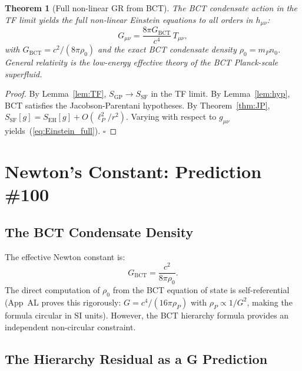 \documentclass[11pt,a4paper]{article}
\theoremstyle{bctthm}
\newtheorem{theorem}{Theorem}
\theoremstyle{definition}
\begin{document}
\begin{theorem}[Full non-linear GR from BCT]\label{thm:main}
The BCT condensate action in the TF limit yields the full non-linear
Einstein equations to all orders in $h_{\mu\nu}$:
\begin{equation}
\boxed{G_{\mu\nu} = \frac{8\pi G_\mathrm{BCT}}{c^4}\,T_{\mu\nu},}
\label{eq:Einstein_full}
\end{equation}
with $G_\mathrm{BCT} = c^2/(8\pi\rho_0)$ and the exact BCT condensate density
$\rho_0 = m_P n_0$. General relativity is the low-energy effective theory of the
BCT Planck-scale superfluid.
\end{theorem}
\begin{proof}
By Lemma~\ref{lem:TF}, $S_\mathrm{GP} \to S_\mathrm{SF}$ in the TF limit.
By Lemma~\ref{lem:hyp}, BCT satisfies the Jacobson-Parentani hypotheses.
By Theorem~\ref{thm:JP}, $S_\mathrm{SF}[g] = S_\mathrm{EH}[g] + O(\ell_P^2/r^2)$.
Varying with respect to $g_{\mu\nu}$ yields~(\ref{eq:Einstein_full}). $\square$
\end{proof}


\section{Newton's Constant: Prediction \#100}

\subsection{The BCT Condensate Density}

The effective Newton constant is:
\begin{equation}
G_\mathrm{BCT} = \frac{c^2}{8\pi\rho_0}.
\label{eq:G_BCT}
\end{equation}
The direct computation of $\rho_0$ from the BCT equation of state is
self-referential (App~AL proves this rigorously: $G = c^4/(16\pi\rho_P)$ with
$\rho_P \propto 1/G^2$, making the formula circular in SI units). However,
the BCT hierarchy formula provides an independent non-circular constraint.

\subsection{The Hierarchy Residual as a G Prediction}
\end{document}
